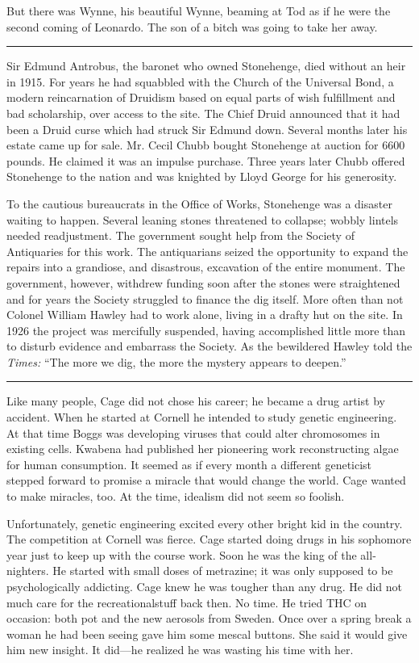 But there was Wynne, his beautiful Wynne, beaming at Tod as if he were the second coming of Leonardo. The son of a bitch was going to take her away.

\fancybreak{* * *}

Sir Edmund Antrobus, the baronet who owned Stonehenge, died without an heir in 1915. For years he had squabbled with the Church of the Universal Bond, a modern reincarnation of Druidism based on equal parts of wish fulfillment and bad scholarship, over access to the site. The Chief Druid announced that it had been a Druid curse which had struck Sir Edmund down. Several months later his estate came up for sale. Mr. Cecil Chubb bought Stonehenge at auction for 6600 pounds. He claimed it was an impulse purchase. Three years later Chubb offered Stonehenge to the nation and was knighted by Lloyd George for his generosity.

To the cautious bureaucrats in the Office of Works, Stonehenge was a disaster waiting to happen. Several leaning stones threatened to collapse; wobbly lintels needed readjustment. The government sought help from the Society of Antiquaries for this work. The antiquarians seized the opportunity to expand the repairs into a grandiose, and disastrous, excavation of the entire monument. The government, however, withdrew funding soon after the stones were straightened and for years the Society struggled to finance the dig itself. More often than not Colonel William Hawley had to work alone, living in a drafty hut on the site. In 1926 the project was mercifully suspended, having accomplished little more than to disturb evidence and embarrass the Society. As the bewildered Hawley told the \textit{Times:} ``The more we dig, the more the mystery appears to deepen.''

\fancybreak{* * *}

Like many people, Cage did not chose his career; he became a drug artist by accident. When he started at Cornell he intended to study genetic engineering. At that time Boggs was developing viruses that could alter chromosomes in existing cells. Kwabena had published her pioneering work reconstructing algae for human consumption. It seemed as if every month a different geneticist stepped forward to promise a miracle that would change the world. Cage wanted to make miracles, too. At the time, idealism did not seem so foolish.

Unfortunately, genetic engineering excited every other bright kid in the country. The competition at Cornell was fierce. Cage started doing drugs in his sophomore year just to keep up with the course work. Soon he was the king of the all-nighters. He started with small doses of metrazine; it was only supposed to be psychologically addicting. Cage knew he was tougher than any drug. He did not much care for the recreationalstuff back then. No time. He tried THC on occasion: both pot and the new aerosols from Sweden. Once over a spring break a woman he had been seeing gave him some mescal buttons. She said it would give him new insight. It did---he realized he was wasting his time with her.

